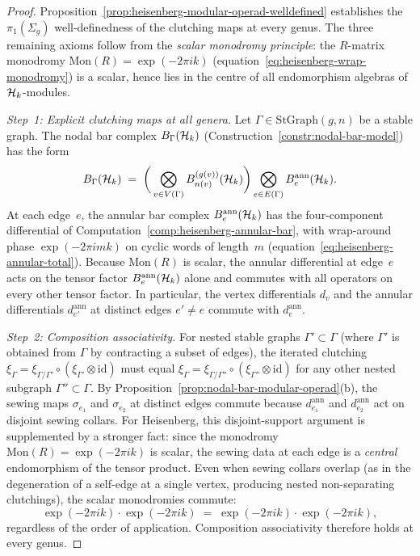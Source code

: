\begin{proof}
Proposition~\ref{prop:heisenberg-modular-operad-welldefined}
establishes the $\pi_1(\Sigma_g)$ well-definedness of the
clutching maps at every genus. The three remaining axioms
follow from the \emph{scalar monodromy principle}: the
$R$-matrix monodromy
$\mathrm{Mon}(R) = \exp(-2\pi ik)$
\textup{(}equation~\eqref{eq:heisenberg-wrap-monodromy}\textup{)}
is a scalar, hence lies in the centre of all endomorphism
algebras of $\mathcal{H}_k$-modules.

\medskip\noindent
\emph{Step~1: Explicit clutching maps at all genera.}
Let $\Gamma \in \mathrm{StGraph}(g,n)$ be a stable graph.
The nodal bar complex
$B_\Gamma(\mathcal{H}_k)$
\textup{(}Construction~\textup{\ref{constr:nodal-bar-model}}\textup{)}
has the form
\[
 B_\Gamma(\mathcal{H}_k)
 \;=\;
 \biggl(\,
 \bigotimes_{v \in V(\Gamma)}
 B^{(g(v))}_{n(v)}(\mathcal{H}_k)
 \biggr)
 \bigotimes_{e \in E(\Gamma)}
 B^{\mathrm{ann}}_e(\mathcal{H}_k).
\]
At each edge~$e$, the annular bar complex
$B^{\mathrm{ann}}_e(\mathcal{H}_k)$ has the four-component
differential of
Computation~\ref{comp:heisenberg-annular-bar}, with
wrap-around phase $\exp(-2\pi imk)$ on cyclic words
of length~$m$
\textup{(}equation~\eqref{eq:heisenberg-annular-total}\textup{)}.
Because $\mathrm{Mon}(R)$ is scalar, the annular
differential at edge~$e$ acts on the tensor factor
$B^{\mathrm{ann}}_e(\mathcal{H}_k)$ alone and commutes with
all operators on every other tensor factor. In
particular, the vertex differentials $d_v$ and the
annular differentials $d^{\mathrm{ann}}_{e'}$ at
distinct edges $e' \ne e$ commute with
$d^{\mathrm{ann}}_e$.

\medskip\noindent
\emph{Step~2: Composition associativity.}
For nested stable graphs
$\Gamma' \subset \Gamma$ (where $\Gamma'$ is obtained
from $\Gamma$ by contracting a subset of edges), the
iterated clutching
$\xi_\Gamma = \xi_{\Gamma/\Gamma'} \circ
(\xi_{\Gamma'} \otimes \mathrm{id})$
must equal
$\xi_\Gamma = \xi_{\Gamma/\Gamma''} \circ
(\xi_{\Gamma''} \otimes \mathrm{id})$
for any other nested subgraph
$\Gamma'' \subset \Gamma$. By
Proposition~\ref{prop:nodal-bar-modular-operad}(b),
the sewing maps $\sigma_{e_1}$ and $\sigma_{e_2}$ at
distinct edges commute because
$d^{\mathrm{ann}}_{e_1}$ and $d^{\mathrm{ann}}_{e_2}$
act on disjoint sewing collars. For Heisenberg, this
disjoint-support argument is supplemented by a stronger
fact: since the monodromy $\mathrm{Mon}(R) = \exp(-2\pi ik)$
is scalar, the sewing data at each edge is a
\emph{central} endomorphism of the tensor product.
Even when sewing collars overlap
(as in the degeneration of a self-edge at a single
vertex, producing nested non-separating clutchings),
the scalar monodromies commute:
\[
 \exp(-2\pi ik)\cdot\exp(-2\pi ik)
 \;=\;
 \exp(-2\pi ik)\cdot\exp(-2\pi ik),
\]
regardless of the order of application. Composition
associativity therefore holds at every genus.


\end{proof}
